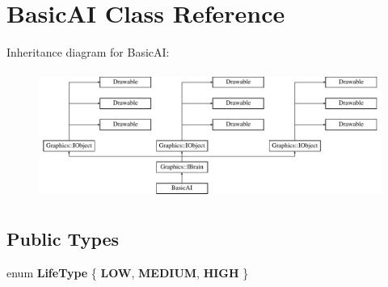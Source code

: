 \section{Basic\+A\+I Class Reference}
\label{class_basic_a_i}
Inheritance diagram for Basic\+A\+I\+:\begin{figure}[H]
\begin{center}
\leavevmode
\includegraphics[height=4.188035cm]{class_basic_a_i}
\end{center}
\end{figure}
\subsection*{Public Types}
\begin{DoxyCompactItemize}
\item 
enum {\bfseries Life\+Type} \{ {\bfseries L\+O\+W}, 
{\bfseries M\+E\+D\+I\+U\+M}, 
{\bfseries H\+I\+G\+H}
 \}\label{class_basic_a_i_aa1eb6fb4a96bcfecdfab62d9f94e6b1d}

\end{DoxyCompactItemize}
